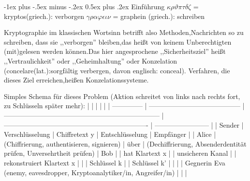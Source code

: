 \documentclass[a4paper]{article}
\makeatletter
\renewcommand{\section}{\@startsection{section}{1}{0mm}%
 {-1ex plus -.5ex minus -.2ex}%
 {0.5ex plus .2ex}%
 {\normalfont\large\bfseries}}
\makeatother
\begin{document}
\raggedright
\begin{multicols}{3}\scriptsize
    \setlength{\premulticols}{1pt}
    \setlength{\postmulticols}{1pt}
    \setlength{\multicolsep}{1pt}
    \setlength{\columnsep}{2pt}

    \section{Einführung}
    $\kappa\rho\vartheta\pi\tau\delta\zeta$ = kryptos(griech.): verborgen
    $\gamma\rho\alpha\varphi\epsilon\iota\nu$ = graphein (griech.): schreiben

    Kryptographie im klassischen Wortsinn betrifft also Methoden,Nachrichten so zu schreiben, dass sie ,,verborgen'' bleiben,das heißt von keinem Unberechtigten (mit)gelesen werden können.Das hier angesprochene ,,Sicherheitsziel'' heißt ,,Vertraulichkeit'' oder ,,Geheimhaltung'' oder Konzelation (concelare(lat.):sorgfältig verbergen, davon englisch: conceal). Verfahren, die dieses Ziel erreichen,heißen Konzelationssysteme.

    Simples Schema für dieses Problem (Aktion schreitet von links nach rechts fort, zu Schlüsseln später mehr):
    |                |                                           |                                                                       |                                                                  |
    | -------------- | ----------------------------------------- | --------------------------------------------------------------------- | ---------------------------------------------------------------- | ------------------------ |
    | Sender         | Verschlüsselung                           | Chiffretext y                                                         | Entschlüsselung                                                  | Empfänger                |
    | Alice          | (Chiffrierung, authentisieren, signieren) | über                                                                  | (Dechiffrierung, Absenderdentität prüfen, Unversehrtheit prüfen) | Bob                      |
    | hat Klartext x |                                           | unsicheren Kanal                                                      |                                                                  | rekonstruiert Klartext x |
    |                | Schlüssel k                               |                                                                       | Schlüssel k'                                                     |
    |                |                                           | Gegnerin Eva (enemy, eavesdropper, Kryptoanalytiker/in, Angreifer/in) |                                                                  |                          |


\end{multicols}
\end{document}

